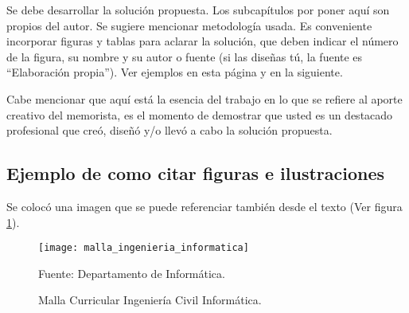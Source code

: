
Se debe desarrollar la solución propuesta. Los subcapítulos por poner aquí son propios del autor. Se sugiere mencionar metodología usada. Es conveniente incorporar figuras y tablas para aclarar la solución, que deben indicar el número de la figura, su nombre y su autor o fuente (si las diseñas tú, la fuente es ``Elaboración propia''). Ver ejemplos en esta página y en la siguiente.

Cabe mencionar que aquí está la esencia del trabajo en lo que se refiere al aporte creativo del memorista, es el momento de demostrar que usted es un destacado profesional que creó, diseñó y/o llevó a cabo la solución propuesta.

\subsection{Ejemplo de como citar figuras e ilustraciones}

Se colocó una imagen que se puede referenciar también desde el texto (Ver figura \ref{fig:malla}).

\begin{figure}[h]
\centering
\texttt{[image: malla\_ingenieria\_informatica]}
\caption{\label{fig:malla} Malla Curricular Ingeniería Civil Informática.} Fuente: Departamento de Informática.
\end{figure}
